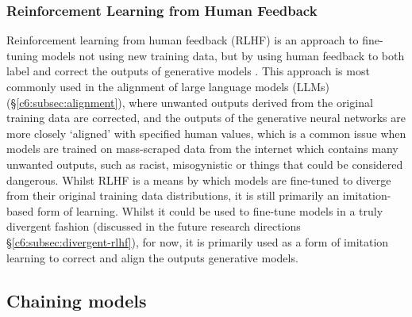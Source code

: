 \subsubsection{Reinforcement Learning from Human Feedback} 

Reinforcement learning from human feedback (RLHF) is an approach to fine-tuning models not using new training data, but by using human feedback to both label and correct the outputs of generative models \citep{ziegler2019fine}. 
This approach is most commonly used in the alignment of large language models (LLMs) (\S \ref{c6:subsec:alignment}), where unwanted outputs derived from the original training data are corrected, and the outputs of the generative neural networks are more closely `aligned' with specified human values, which is a common issue when models are trained on mass-scraped data from the internet which contains many unwanted outputs, such as racist, misogynistic or things that could be considered dangerous.
Whilst RLHF is a means by which models are fine-tuned to diverge from their original training data distributions, it is still primarily an imitation-based form of learning.
Whilst it could be used to fine-tune models in a truly divergent fashion (discussed in the future research directions \S \ref{c6:subsec:divergent-rlhf}), for now, it is primarily used as a form of imitation learning to correct and align the outputs generative models.

\subsection{Chaining models}
\label{survey:chaining}

